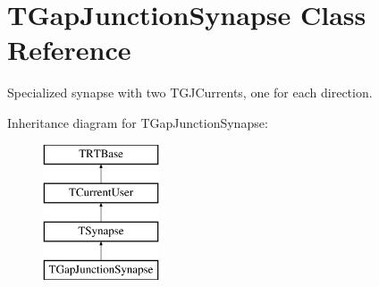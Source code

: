 \hypertarget{class_t_gap_junction_synapse}{\section{T\+Gap\+Junction\+Synapse Class Reference}
\label{class_t_gap_junction_synapse}
}


Specialized synapse with two T\+G\+J\+Currents, one for each direction.  


Inheritance diagram for T\+Gap\+Junction\+Synapse\+:\begin{figure}[H]
\begin{center}
\leavevmode
\includegraphics[height=4.000000cm]{class_t_gap_junction_synapse}
\end{center}
\end{figure}

